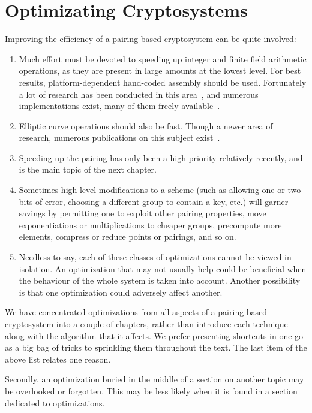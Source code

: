 \chapter{Optimizating Cryptosystems}

Improving the efficiency of a pairing-based cryptosystem can be quite involved:

\begin{enumerate}
\item
Much effort must be devoted to speeding up
integer and finite field arithmetic operations, as they are present
in large amounts at the lowest level. For best results, platform-dependent
hand-coded assembly should be used.
Fortunately a lot of research has been conducted in this area~\cite{taocp2},
and numerous implementations exist, many of them freely available~\cite{gmp, miracl}.
\item
Elliptic curve operations should also be fast. Though a newer area of research,
numerous publications on this subject exist~\cite{bss}.
\item
Speeding up the pairing has only been a high priority relatively recently,
and is the main topic of the next chapter.
\item
Sometimes high-level modifications to a scheme (such as allowing one or
two bits of error, choosing a different group to contain a key, etc.)
will garner savings by
permitting one to
exploit other pairing properties,
move exponentiations or multiplications to cheaper groups,
precompute more elements,
compress or reduce points or pairings, and so on.
\item
Needless to say, each of these classes of optimizations cannot be viewed
in isolation. An optimization that may not usually help could be beneficial
when the behaviour of the whole system is taken into account.
Another possibility is that
one optimization could adversely affect another.
\end{enumerate}

We have concentrated optimizations from all aspects of
a pairing-based cryptosystem into a couple of chapters,
rather than introduce each technique along with the algorithm that it
affects. We prefer presenting shortcuts in one go as a big bag of tricks to
sprinkling them throughout the text.
The last item of the above list relates one reason.

Secondly, an optimization buried in the middle of a section on another topic
may be overlooked or forgotten. This may be less likely when it is found in
a section dedicated to optimizations.

